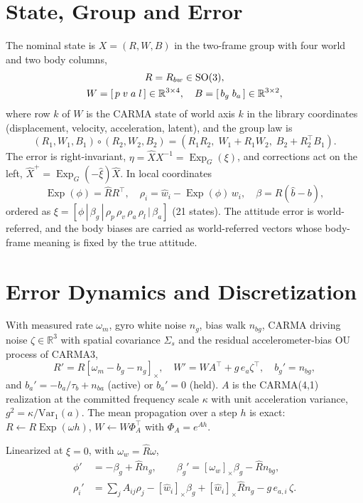 \documentclass[conference]{IEEEtran}
\newcommand{\R}{\mathbb{R}}
\newcommand{\Skew}[1]{\left[#1\right]_\times}
\DeclareMathOperator{\Exp}{Exp}
\theoremstyle{bodysmall}
\begin{document}
\section{State, Group and Error}
\label{sec:group}
The nominal state is $X=(R,W,B)$ in the two-frame group with four world and
two body columns,
\begin{gather}
R=R_{bw}\in\mathrm{SO}(3),\notag\\
W=[\,p\;v\;a\;l\,]\in\R^{3\times4},\quad
B=[\,b_g\;b_a\,]\in\R^{3\times2},
\end{gather}
where row $k$ of $W$ is the CARMA state of world axis $k$ in the library
coordinates (displacement, velocity, acceleration, latent), and the group law
is
\begin{equation}
(R_1,W_1,B_1)\circ(R_2,W_2,B_2)=(R_1R_2,\;W_1+R_1W_2,\;B_2+R_2^{\top}B_1).
\end{equation}
The error is right-invariant, $\eta=\hat X X^{-1}=\Exp_G(\xi)$, and corrections
act on the left, $\hat X^{+}=\Exp_G(-\hat\xi)\hat X$. In local coordinates
\begin{equation}
\Exp(\phi)=\hat R R^{\top},\quad \rho_i=\hat w_i-\Exp(\phi)\,w_i,\quad
\beta=R(\hat b-b),
\end{equation}
ordered as $\xi=[\phi\,|\,\beta_g\,|\,\rho_p\,\rho_v\,\rho_a\,\rho_l\,|\,\beta_a]$
(21 states). The attitude error is world-referred, and the body biases are
carried as world-referred vectors whose body-frame meaning is fixed by the
true attitude.

\section{Error Dynamics and Discretization}
\label{sec:dynamics}
With measured rate $\omega_m$, gyro white noise $n_g$, bias walk $n_{bg}$,
CARMA driving noise $\zeta\in\R^3$ with spatial covariance $\Sigma_s$ and the
residual accelerometer-bias OU process of CARMA3,
\begin{equation}
R'=R\Skew{\omega_m-b_g-n_g},\quad W'=WA^{\top}+g\,e_a\zeta^{\top},\quad
b_g'=n_{bg},
\end{equation}
and $b_a'=-b_a/\tau_b+n_{ba}$ (active) or $b_a'=0$ (held). $A$ is the
CARMA(4,1) realization at the committed frequency scale $\kappa$ with unit
acceleration variance, $g^2=\kappa/\mathrm{Var}_1(a)$. The mean propagation
over a step $h$ is exact: $R\leftarrow R\Exp(\omega h)$,
$W\leftarrow W\Phi_A^{\top}$ with $\Phi_A=e^{Ah}$.

Linearized at $\xi=0$, with $\omega_w=\hat R\omega$,
\begin{align}
\phi' &= -\beta_g+\hat R n_g,\qquad
\beta_g' = \Skew{\omega_w}\beta_g-\hat R n_{bg},\\
\rho_i' &= \textstyle\sum_j A_{ij}\rho_j-\Skew{\hat w_i}\beta_g
           +\Skew{\hat w_i}\hat R n_g-g\,e_{a,i}\,\zeta .
\end{align}
\end{document}
